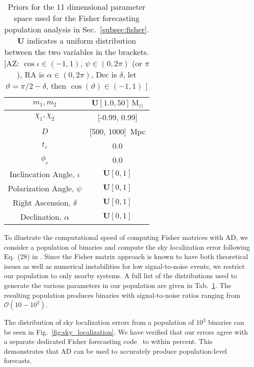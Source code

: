 \documentclass[twocolumn]{aastex631}
\newcommand{\AZ}[1]{{\color{Burnt}[AZ: #1]}}
\begin{document}
\begin{table}[t]
    \centering
    \begin{tabular}{c|c}
    \hline\hline
    $m_1, m_2$ & $\boldsymbol{U}[1.0, 50]\, \mathrm{M}_\odot$ \\ \hline
    $\chi_1, \chi_2$ & [-0.99, 0.99] \\ \hline
    $D$ & [500, 1000]\, Mpc \\ \hline
    $t_c$ & 0.0 \\ \hline
    $\phi_c$ & 0.0 \\ \hline
    Inclincation Angle, $\iota$ & $\boldsymbol{U}[0, 1]$ \\ \hline
    Polarization Angle, $\psi$ & $\boldsymbol{U}[0, 1]$ \\ \hline
    Right Ascension, $\delta$ & $\boldsymbol{U}[0, 1]$ \\ \hline
    Declination, $\alpha$ & $\boldsymbol{U}[0, 1]$ \\ 
    \hline\hline
    \end{tabular}
    \caption{Priors for the 11 dimensional parameter space used for the Fisher forecasting population analysis in Sec.~\ref{subsec:fisher}. 
    $\boldsymbol{U}$ indicates a uniform distribution between the two variables in the brackets.
    \AZ{$\cos \iota \in (-1,1)$, $\psi \in (0,2 \pi)$ (or $\pi$), RA is $\alpha \in (0, 2\pi)$, Dec is $\delta$, let $\vartheta = \pi/2 - \delta$, then $\cos (\vartheta) \in (-1,1)$ }
    }
    \label{tab:priors}
\end{table}

To illustrate the computational speed of computing Fisher matrices with AD, we consider a population of binaries and compute the sky localization error following Eq.~(28) in \cite{Iacovelli:2022bbs, Iacovelli:2022mbg}.
Since the Fisher matrix approach is known to have both theoretical issues as well as numerical instabilities for low signal-to-noise events, we restrict our population to only nearby systems.
A full list of the distributions used to generate the various parameters in our population are given in Tab.~\ref{tab:priors}.
The resulting population produces binaries with signal-to-noise ratios ranging from $\mathcal{O}(10-10^2)$.

The distribution of sky localization errors from a population of $10^3$ binaries can be seen in Fig.~\ref{fig:sky_localization}.
We have verified that our errors agree with a separate dedicated Fisher forecasting code~\citep{Borhanian:2020ypi} to within {\color{red}{X}} percent.
This demonstrates that AD can be used to accurately produce population-level forecasts.
\end{document}
